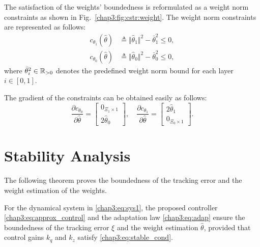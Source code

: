 The satisfaction of the weights' boundedness is reformulated as a weight norm constraints as shown in Fig.~\ref{chap3:fig:cstr:weight}.
The weight norm constraints are represented as follows:
\begin{equation}
    \begin{aligned}
        c_{\theta_1}(\hat\theta) &\triangleq \Vert \hat\theta_1\Vert^2 - \bar\theta_1^2 \le 0,\\
        c_{\theta_0}(\hat\theta) &\triangleq \Vert \hat\theta_0\Vert^2 - \bar\theta_0^2 \le 0,
    \end{aligned}
    \label{chap3:eq:cstr:weight}
\end{equation}
where $\bar\theta_i^2\in\mathbb{R}_{>0}$ denotes the predefined weight norm bound for each layer $i\in[0,1]$.

The gradient of the constraints can be obtained easily as follows:
\begin{equation}
  \frac{\partial c_{\theta_0}}{\partial\hat\theta}
  = 
  \begin{bmatrix}
      0_{\Xi_1\times 1} \\
      2\hat\theta_0 
  \end{bmatrix}
  ,\quad
  \frac{\partial c_{\theta_1}}{\partial\hat\theta}    
  = 
  \begin{bmatrix}
      2\hat\theta_1 \\
      0_{\Xi_0\times 1}
  \end{bmatrix}
  .
  \label{chap3:eq:cstr:weight_grad}
\end{equation}

\section{Stability Analysis}

The following theorem proves the boundedness of the tracking error and the weight estimation of the weights.

\begin{theorem}
    For the dynamical system in \eqref{chap3:eq:sys1}, the proposed controller \eqref{chap3:eq:approx_control} and the adaptation law \eqref{chap3:eq:adap} ensure the boundedness of the tracking error $\xi$ and the weight estimation $\hat\theta$, provided that control gains ${k_q}$ and ${k_z}$ satisfy \eqref{chap3:eq:stable_cond}.
\end{theorem}

